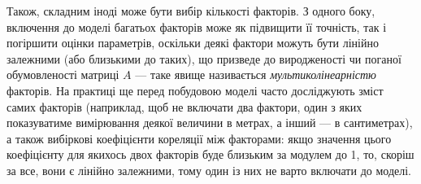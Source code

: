 Також, складним іноді може бути вибір кількості факторів. З одного боку, включення до моделі
багатьох факторів може як підвищити її точність, так і погіршити оцінки параметрів, оскільки деякі фактори
можуть бути лінійно залежними (або близькими до таких), що призведе до виродженості чи поганої обумовленості матриці $A$ --- таке 
явище називається \emph{мультиколінеарністю} факторів. На практиці ще перед побудовою моделі часто
досліджують зміст самих факторів (наприклад, щоб не включати два фактори, один з яких показуватиме 
вимірювання деякої величини в метрах, а інший --- в сантиметрах), а також вибіркові коефіцієнти кореляції між факторами:
якщо значення цього коефіцієнту для якихось двох факторів буде близьким за модулем до 1,
то, скоріш за все, вони є лінійно залежними, тому один із них не варто включати до моделі.

